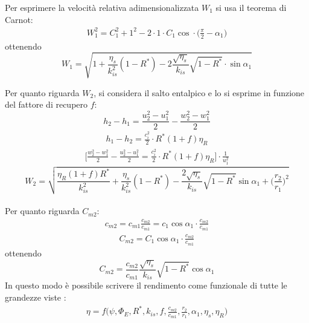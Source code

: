 Per esprimere la velocità relativa adimensionalizzata $W_1$ si usa il teorema di Carnot:
\begin{align*}
W_1^2 = C_1^2 + 1^2 - 2 \cdot 1 \cdot C_1 \cos \cdot \big( \frac{\pi}{2} - \alpha_1 \big)
\end{align*}
ottenendo
\begin{equation}
\boxed{ W_1 = \sqrt{1 + \frac{\eta_{s}}{k_{is}^2} \left( 1 - R^* \right) - 2 \frac{\sqrt{\eta_s}}{k_{is}} \sqrt{1-R^*} \cdot \sin \alpha_1}}
\label{eq:W1}
\end{equation}

Per quanto riguarda $W_2$, si considera il salto entalpico e lo si esprime in funzione del fattore di recupero $f$:
\begin{equation}
h_2 - h_1 = \frac{u_2^2 - u_1^2}{2} - \frac{w_2^2 - w_1^2}{2}
\end{equation}
\begin{align*}
h_1 - h_2 = \frac{c_i^2}{2} \cdot R^* \left( 1 + f \right) \eta_R
\end{align*}
\begin{align*}
\Bigg[\frac{w_2^2 - w_1^2}{2} - \frac{u_2^2 - u_1^2}{2} = \frac{c_i^2}{2} \cdot R^* \left( 1 + f \right) \eta_R \Bigg] \cdot \frac{1}{u_1^2}
\end{align*}
\begin{equation}
\boxed{W_2 = \sqrt{\frac{\eta_R \left( 1 + f \right) R^*}{k_{is}^2} + \frac{\eta_s}{k_{is}^2}  \left(1 - R^* \right) - \frac{2 \sqrt{\eta_s}}{k_{is}} \sqrt{1 - R^*} \sin \alpha_1 + \bigg(\frac{r_2}{r_1} \bigg)^2 } }
\end{equation}
\\Per quanto riguarda $C_{m2}$:
\begin{align*}
c_{m2} = c_{m1} \frac{c_{m2}}{c_{m1}}=c_1 \cos \alpha_1 \cdot \frac{c_{m2}}{c_{m1}}
\end{align*}
\begin{align*}
C_{m2} = C_1 \cos \alpha_1 \cdot \frac{c_{m2}}{c_{m1}}
\end{align*}
ottenendo
\begin{equation}
\boxed{C_{m2} = \frac{c_{m2}}{c_{m1}} \frac{\sqrt{\eta_s}}{k_{is}} \sqrt{1 - R^*} \cos \alpha_1 }
\end{equation}
In questo modo è possibile scrivere il rendimento come funzionale di tutte le grandezze viste :
\begin{align*}
\boxed{\eta = f \bigg( \psi, \Phi_E, R^*, k_{is}, f, \frac{c_{m2}}{c_{m1}}, \frac{r_2}{r_1}, \alpha_1, \eta_s, \eta_R \bigg)}
\end{align*}
